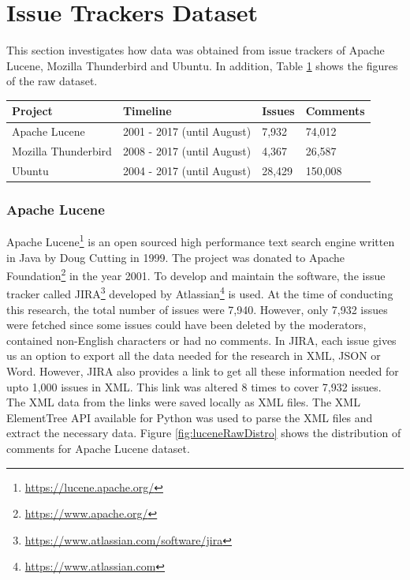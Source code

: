 \documentclass[a4paper,12pt,twoside]{report}
\begin{document}
\section{Issue Trackers Dataset}
This section investigates how data was obtained from issue trackers of Apache Lucene, Mozilla Thunderbird and Ubuntu. In addition, Table \ref{tab:rawIssueTrackers} shows the figures of the raw dataset. 

\begin{table} %
    \centering
    \begin{adjustbox}{max width=\columnwidth}
    \def\arraystretch{1} %
    \begin{tabular}{p{4cm} p{5cm} p{2cm} p{3cm}}
        \toprule
        \textbf{Project} & \textbf{Timeline} & \textbf{Issues} & \textbf{Comments}\\
        \midrule
			Apache Lucene & 2001 - 2017 (until August) & 7,932 & 74,012\\
			Mozilla Thunderbird & 2008 - 2017 (until August) & 4,367 & 26,587\\ 
			Ubuntu & 2004 - 2017 (until August) & 28,429 & 150,008\\
        \midrule
    \end{tabular}
    \end{adjustbox}
    \label{tab:rawIssueTrackers}
\end{table}

\subsubsection{Apache Lucene}
Apache Lucene\footnote{\url{https://lucene.apache.org/}} is an open sourced high performance text search engine written in Java by Doug Cutting in 1999. The project was donated to Apache Foundation\footnote{\url{https://www.apache.org/}} in the year 2001. To develop and maintain the software, the issue tracker called JIRA\footnote{\url{https://www.atlassian.com/software/jira}} developed by Atlassian\footnote{\url{https://www.atlassian.com}} is used. At the time of conducting this research, the total number of issues were 7,940. However, only 7,932 issues were fetched since some issues could have been deleted by the moderators, contained non-English characters or had no comments.
\bigbreak
In JIRA, each issue gives us an option to export all the data needed for the research in XML, JSON or Word. However, JIRA also provides a link to get all these information needed for upto 1,000 issues in XML. This link was altered 8 times to cover 7,932 issues. The XML data from the links were saved locally as XML files. The XML ElementTree API available for Python was used to parse the XML files and extract the necessary data. Figure \ref{fig:luceneRawDistro} shows the distribution of comments for Apache Lucene dataset. 
\end{document}
